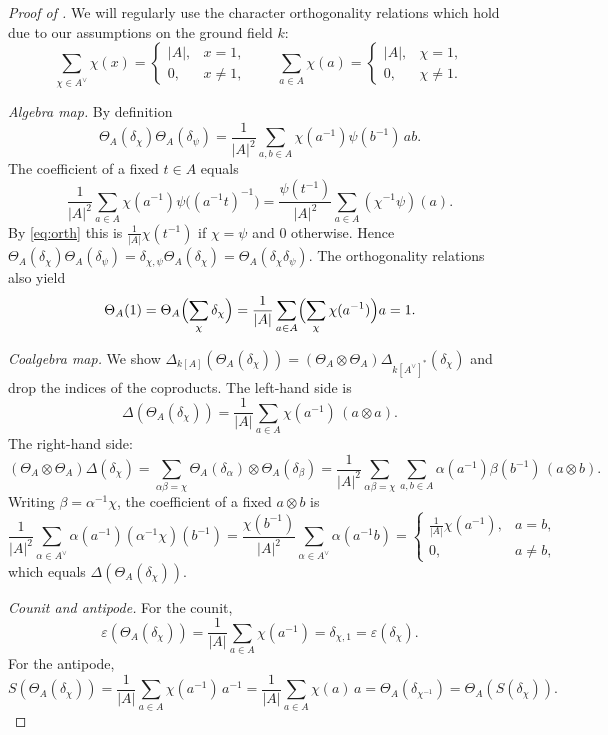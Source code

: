 \documentclass[10pt,a4paper]{amsart}
\newcommand\D{\Delta}
\begin{document}
\begin{proof}[Proof of ]
We will regularly use the character orthogonality relations which hold due to our assumptions on the ground field $k$:
\begin{equation}\label{eq:orth}
\sum_{\chi\in A^\vee}\chi(x)=
\begin{cases}
|A|,& x=1,\\
0,& x\neq 1,
\end{cases}
\qquad
\sum_{a\in A}\chi(a)=
\begin{cases}
|A|,& \chi=1,\\
0,& \chi\neq 1.
\end{cases}
\end{equation}

\medskip\noindent
{\it Algebra map.} By definition 
$$ \Theta_A(\delta_\chi)\Theta_A(\delta_\psi)
=\frac1{|A|^2}\sum_{a,b\in A}\chi(a^{-1})\psi(b^{-1})\,ab.
$$
The coefficient of a fixed $t\in A$ equals
\[
\frac1{|A|^2}\sum_{a\in A}\chi(a^{-1})\psi\bigl((a^{-1}t)^{-1}\bigr)
=\frac{\psi(t^{-1})}{|A|^2}\sum_{a\in A}(\chi^{-1}\psi)(a).
\]
By \eqref{eq:orth} this is $\frac1{|A|}\chi(t^{-1})$ if $\chi=\psi$ and $0$ otherwise. Hence
$\Theta_A(\delta_\chi)\Theta_A(\delta_\psi)=\delta_{\chi,\psi}\Theta_A(\delta_\chi)=\Theta_A(\delta_\chi\delta_\psi)$.
The orthogonality relations also yield
\[
\Theta_A(1)=\Theta_A\Bigl(\sum_{\chi}\delta_\chi\Bigr)
=\frac1{|A|}\sum_{a\in A}\Bigl(\sum_{\chi}\chi(a^{-1})\Bigr)a
=1.
\]


\medskip\noindent
{\it Coalgebra map.}
We show $\D_{k[A]} (\Theta_A(\delta_\chi))=(\Theta_A\otimes \Theta_A)\D_{k[A^{\vee}]^*} (\delta_\chi)$ and drop the indices of the coproducts.
The left-hand side is
\[
\D (\Theta_A(\delta_\chi))=\frac1{|A|}\sum_{a\in A}\chi(a^{-1})\,(a\otimes a).
\]
The right-hand side:
\[
(\Theta_A\otimes\Theta_A)\D (\delta_\chi)
=\sum_{\alpha\beta=\chi}\Theta_A(\delta_\alpha)\otimes\Theta_A(\delta_\beta)
=\frac1{|A|^2}\sum_{\alpha\beta=\chi}\sum_{a,b\in A}\alpha(a^{-1})\beta(b^{-1})\,(a\otimes b).
\]
Writing $\beta=\alpha^{-1}\chi$, the coefficient of a fixed $a\otimes b$ is
\[
\frac1{|A|^2}\sum_{\alpha\in A^\vee}\alpha(a^{-1})(\alpha^{-1}\chi)(b^{-1})
=\frac{\chi(b^{-1})}{|A|^2}\sum_{\alpha\in A^\vee}\alpha(a^{-1}b)
=\begin{cases}
\frac1{|A|}\chi(a^{-1}),& a=b,\\
0,& a\neq b,
\end{cases}
\]
which equals $\D (\Theta_A(\delta_\chi))$.

\medskip\noindent
{\it Counit and antipode.}
For the counit,
\[
\varepsilon(\Theta_A(\delta_\chi))=\frac1{|A|}\sum_{a\in A}\chi(a^{-1})=\delta_{\chi,1}=\varepsilon(\delta_\chi).
\]
For the antipode,
\[
S(\Theta_A(\delta_\chi))
=\frac1{|A|}\sum_{a\in A}\chi(a^{-1})\,a^{-1}
=\frac1{|A|}\sum_{a\in A}\chi(a)\,a
=\Theta_A(\delta_{\chi^{-1}})
=\Theta_A(S(\delta_\chi)).
\]




\end{proof}
\end{document}
